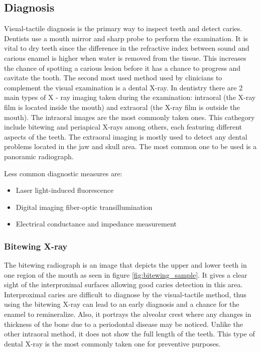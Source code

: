\subsection{Diagnosis}
Visual-tactile diagnosis is the primary way to inspect teeth and detect caries. Dentists use a mouth mirror and sharp probe to perform the examination. It is vital to dry teeth since the difference in the refractive index between sound and carious enamel is higher when water is removed from the tissue. This increases the chance of spotting a carious lesion before it has a chance to progress and cavitate the tooth.
The second most used method used by clinicians to complement the visual examination is a dental X-ray. In dentistry there are 2 main types of X - ray imaging taken during the examination: intraoral (the X-ray film is located inside the mouth) and extraoral (the X-ray film is outside the mouth). The intraoral images are the most commonly taken ones. This cathegory include bitewing and periapical X-rays among others, each featuring different aspects of the teeth. The extraoral imaging is mostly used to detect any dental problems located in the jaw and skull area. The most common one to be used is a panoramic radiograph.

\newline
Less common diagnostic measures are:
\begin{itemize}
    \item Laser light-induced fluorescence
    \item Digital imaging fiber-optic transillumination
    \item Electrical conductance and impedance measurement
\end{itemize}

\subsubsection{Bitewing X-ray}
The bitewing radiograph is an image that depicts the upper and lower teeth in one region of the mouth as seen in figure \ref{fig:bitewing_sample}. It gives a clear sight of the interproximal surfaces allowing good caries detection in this area. Interproximal caries are difficult to diagnose by the visual-tactile method, thus using the bitewing X-ray can lead to an early diagnosis and a chance for the enamel to remineralize. Also, it portrays the alveolar crest where any changes in thickness of the bone due to a periodontal disease may be noticed. Unlike the other intraoral method, it does not show the full length of the teeth. This type of dental X-ray is the most commonly taken one for preventive purposes. 

